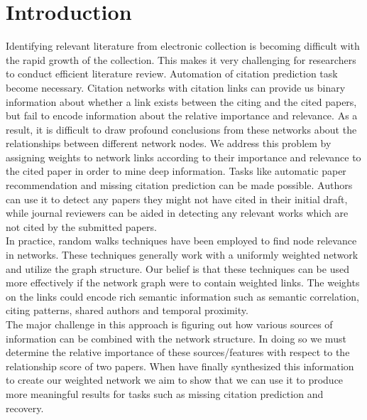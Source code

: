 \documentclass{article} %
\begin{document}
\section{Introduction}
Identifying relevant literature from electronic collection is becoming difficult with the rapid growth of the collection. This makes it very challenging for researchers to conduct efficient literature review. Automation of citation prediction task become necessary. Citation networks with citation links can provide us binary information about whether a link exists between the citing and the cited papers, but fail to encode information about the relative importance and relevance. As a result, it is difficult to draw profound conclusions from these networks about the relationships between different network nodes. We address this problem by assigning weights to network links according to their importance and relevance to the cited paper in order to mine deep information. Tasks like automatic paper recommendation and missing citation prediction can be made possible. Authors can use it to detect any papers they might not have cited in their initial draft, while journal reviewers can be aided in detecting any relevant works which are not cited by the submitted papers.\\
	In practice, random walks techniques \cite{Backstrom:2011:SRW:1935826.1935914,Sarkar2009,Tong2006} have been employed to find node relevance in networks. These techniques generally work with a uniformly weighted network and utilize the graph structure. Our belief is that these techniques can be used more effectively if the network graph were to contain weighted links. The weights on the links could encode rich semantic information such as semantic correlation, citing patterns, shared authors and temporal proximity.\\
The major challenge in this approach is figuring out how various sources of information can be combined with the network structure. In doing so we must determine the relative importance of these sources/features with respect to the relationship score of two papers. When have finally synthesized this information to create our weighted network we aim to show that we can use it to produce more meaningful results for tasks such as missing citation prediction and recovery.
\end{document}
